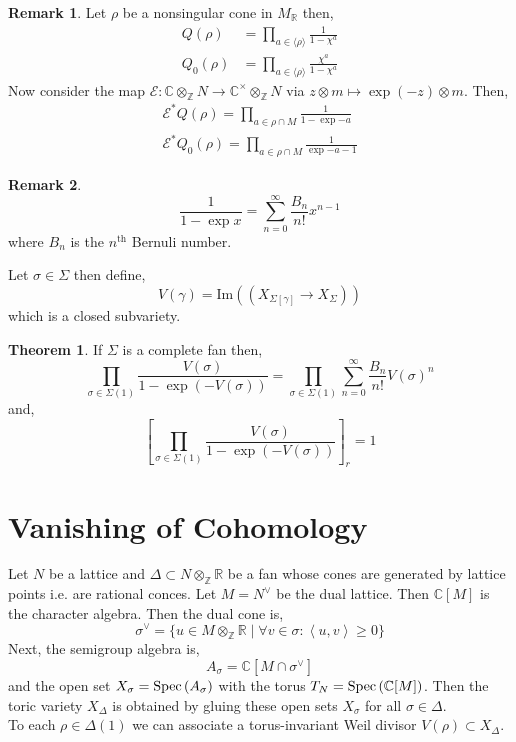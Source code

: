 \documentclass[12pt]{extarticle}
\newcommand{\Z}{\mathbb{Z}}
\newcommand{\R}{\mathbb{R}}
\newcommand{\C}{\mathbb{C}}
\renewcommand{\Im}[1]{\mathrm{Im}(#1)}
\theoremstyle{definition}
\newtheorem{theorem}{Theorem}[section]
\newtheorem{remark}{Remark}
\newenvironment{definition}[1][Definition:]{\begin{trivlist}
\item[\hskip \labelsep {\bfseries #1}]}{\end{trivlist}}
\newcommand{\gen}[1]{\langle #1 \rangle}
\newcommand{\inner}[2]{\left< #1, #2 \right>}
\begin{document}
\begin{remark}
Let $\rho$ be a nonsingular cone in $M_\R$ then,
\begin{align*}
Q(\rho) & = \prod_{a \in \gen{\rho}} \frac{1}{1 - \chi^a} 
\\
Q_0(\rho) & = \prod_{a \in \gen{\rho}} \frac{\chi^a}{1 - \chi^a} 
\end{align*}
Now consider the map $\mathcal{E} : \C \otimes_\Z N \to \C^\times \otimes_\Z N$ via $z \otimes m \mapsto \exp{(-z)} \otimes m$. 
Then,
\begin{align*}
\mathcal{E}^* Q(\rho) = \prod_{a \in \rho \cap M} \frac{1}{1 - \exp{-a}}
\\
\mathcal{E}^* Q_0(\rho) = \prod_{a \in \rho \cap M} \frac{1}{\exp{-a} - 1}
\end{align*}
\end{remark}

\begin{remark}
\[ \frac{1}{1 - \exp{x}} = \sum_{n = 0}^\infty \frac{B_n}{n!} x^{n-1} \]
where $B_n$ is the $n^{\text{th}}$ Bernuli number.
\end{remark}

\begin{definition}
Let $\sigma \in \Sigma$ then define,
\[ V(\gamma) = \Im{( X_{\Sigma[\gamma]} \to X_\Sigma)} \]
which is a closed subvariety. 
\end{definition}

\begin{theorem}
If $\Sigma$ is a complete fan then,
\[ \prod_{\sigma \in \Sigma(1)} \frac{V(\sigma)}{1 - \exp{(-V(\sigma))}} = \prod_{\sigma \in \Sigma(1)} \sum_{n = 0}^\infty \frac{B_n}{n!} V(\sigma)^n \]
and,
\[ \left[ \prod_{\sigma \in \Sigma(1)} \frac{V(\sigma)}{1 - \exp{(-V(\sigma))}} \right]_r = 1 \]
\end{theorem}

\section{Vanishing of Cohomology}

Let $N$ be a lattice and $\Delta \subset N \otimes_\Z  \R$ be a fan whose cones are generated by lattice points i.e. are rational conces. Let $M = N^\vee$ be the dual lattice. Then $\C[M]$ is the character algebra. Then the dual cone is,
\[ \sigma^\vee = \{ u \in M \otimes_\Z \R \mid \forall v \in \sigma : \inner{u}{v} \ge 0 \} \]
Next, the semigroup algebra is,
\[ A_\sigma = \C[M \cap \sigma^\vee ] \]
and the open set $X_\sigma = \mathrm{Spec}\left( A_\sigma \right)$ with the torus $T_N = \Spec{\C[M]}$. Then the toric variety $X_\Delta$ is obtained by gluing these open sets $X_\sigma$ for all $\sigma \in \Delta$. 
\bigskip\\
To each $\rho \in \Delta(1)$ we can associate a torus-invariant Weil divisor $V(\rho) \subset X_\Delta$. 
\end{document}
